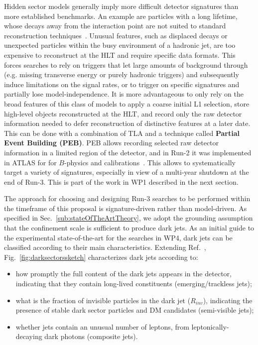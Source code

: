 Hidden sector models generally imply more difficult detector signatures than more established benchmarks. 
An example are particles with a long lifetime, whose decays away from the interaction point are not suited to standard reconstruction techniques~\cite{ToBeCited}.
Unusual features, such as displaced decays or unexpected particles within the busy environment of a hadronic jet, are too expensive to reconstruct at the HLT and require specific data formats. %
This forces searches to rely on triggers that let large amounts of background through (e.g. missing transverse energy or purely hadronic triggers) and subsequently induce limitations on the signal rates, or to trigger on specific signatures and partially lose model-independence. 
It is more advantageous to only rely on the broad features of this class of models to apply a coarse initial L1 selection, store high-level objects reconstructed at the HLT, and record only the raw detector information needed to defer reconstruction of distinctive features at a later date. This can be done with a combination of TLA and a technique called \textbf{Partial Event Building (PEB)}. PEB allows recording selected raw detector information in a limited region of the detector, and in Run-2 it was implemented in ATLAS for for $B$-physics and calibrations~\cite{ToBeCited}.%
This allows to systematically target a variety of signatures, especially in view of a multi-year shutdown at the end of Run-3. 
This is part of the work in WP1 described in the next section. 

The approach for choosing and designing Run-3 searches to be performed within the timeframe of this proposal is signature-driven rather than model-driven. 
As specified in Sec.~\ref{sub:stateOfTheArtTheory}, we adopt the grounding assumption that the confinement scale is sufficient to produce dark jets. 
As an initial guide to the experimental state-of-the-art for the searches in WP4, dark jets can be classified according to their main characteristics. 
Extending Ref.~\cite{Cohen:2017pzm, Park:2017rfb}, Fig.~\ref{fig:darksectorssketch} characterizes dark jets according to: 
\begin{itemize}
\item how promptly the full content of the dark jets appears in the detector, indicating that they contain long-lived constituents (emerging/trackless jets);
\item what is the fraction of invisible particles in the dark jet ($R_{inv}$), indicating the presence of stable dark sector particles and DM candidates (semi-visible jets);
\item whether jets contain an unusual number of leptons, from leptonically-decaying dark photons (composite jets).
\end{itemize}


